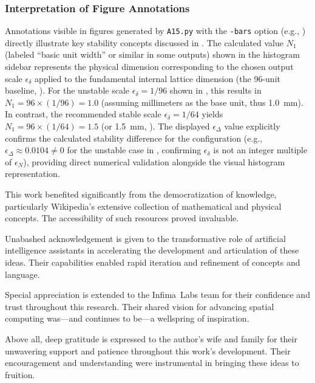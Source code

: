 \documentclass[10pt]{article}
\def\IL{Infima~Labs}
\begin{document}
\subsubsection{Interpretation of Figure Annotations}\label{subsubsec-notes-figures}
Annotations visible in figures generated by \texttt{A15.py} with the \texttt{-bars} option (e.g., ) directly illustrate key stability concepts discussed in . The calculated value $N_1$ (labeled ``basic unit width'' or similar in some outputs) shown in the histogram sidebar represents the physical dimension corresponding to the chosen output scale $\epsilon_\delta$ applied to the fundamental internal lattice dimension (the 96-unit baseline, ). For the unstable scale $\epsilon_\delta=1/96$ shown in , this results in $N_1 = 96 \times (1/96) = 1.0$ (assuming millimeters as the base unit, thus \SI{1.0}{\milli\meter}). In contrast, the recommended stable scale $\epsilon_\delta = 1/64$ yields $N_1 = 96 \times (1/64) = 1.5$ (or \SI{1.5}{\milli\meter}, ). The displayed $\epsilon_\Delta$ value explicitly confirms the calculated stability difference for the configuration (e.g., $\epsilon_\Delta \approx \num{0.0104} \neq 0$ for the unstable case in , confirming $\epsilon_\delta$ is not an integer multiple of $\epsilon_N$), providing direct numerical validation alongside the visual histogram representation.


\begin{acknowledgements}
    This work benefited significantly from the democratization of knowledge, particularly Wikipedia's extensive collection of mathematical and physical concepts. The accessibility of such resources proved invaluable.

    Unabashed acknowledgement is given to the transformative role of artificial intelligence assistants in accelerating the development and articulation of these ideas. Their capabilities enabled rapid iteration and refinement of concepts and language.

    Special appreciation is extended to the \IL{} team for their confidence and trust throughout this research. Their shared vision for advancing spatial computing was---and continues to be---a wellspring of inspiration.

    Above all, deep gratitude is expressed to the author's wife and family for their unwavering support and patience throughout this work's development. Their encouragement and understanding were instrumental in bringing these ideas to fruition.
\end{acknowledgements}




\end{document}
